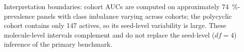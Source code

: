 \documentclass[11pt,a4paper]{article}
\begin{document}
Interpretation boundaries: cohort AUCs are computed on approximately \qty{74}{\percent}-prevalence panels with class imbalance varying across cohorts; the polycyclic cohort contains only \num{147} actives, so its seed-level variability is large. These molecule-level intervals complement and do not replace the seed-level ($df=\num{4}$) inference of the primary benchmark.



\end{document}
